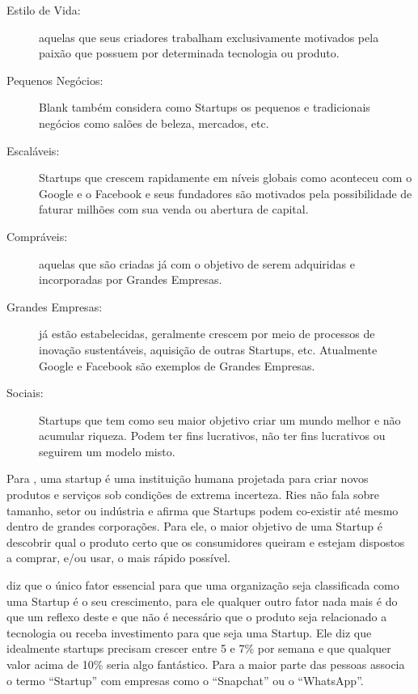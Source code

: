 \begin{description}
	\item [Estilo de Vida:] aquelas que seus criadores trabalham exclusivamente motivados pela paixão que possuem por determinada tecnologia ou produto.

	\item [Pequenos Negócios:] Blank também considera como Startups os pequenos e tradicionais negócios como salões de beleza, mercados, etc.

	\item [Escaláveis:] Startups que crescem rapidamente em níveis globais como aconteceu com o Google e o Facebook e seus fundadores são motivados pela possibilidade de faturar milhões com sua venda ou abertura de capital.

	\item [Compráveis:] aquelas que são criadas já com o objetivo de serem adquiridas e incorporadas por Grandes Empresas.

	\item [Grandes Empresas:] já estão estabelecidas, geralmente crescem por meio de processos de inovação sustentáveis, aquisição de outras Startups, etc. Atualmente Google e Facebook são exemplos de Grandes Empresas.

	\item [Sociais:] Startups que tem como seu maior objetivo criar um mundo melhor e não acumular riqueza. Podem ter fins lucrativos, não ter fins lucrativos ou seguirem um modelo misto.
\end{description}

Para , uma startup é uma instituição humana projetada para criar novos produtos e serviços sob condições de extrema incerteza. Ries não fala sobre tamanho, setor ou indústria e afirma que Startups podem co-existir até mesmo dentro de grandes corporações. Para ele, o maior objetivo de uma Startup é descobrir qual o produto certo que os consumidores queiram e estejam dispostos a comprar, e/ou usar, o mais rápido possível. 

 diz que o único fator essencial para que uma organização seja classificada como uma Startup é o seu crescimento, para ele qualquer outro fator nada mais é do que um reflexo deste e que não é necessário que o produto seja relacionado a tecnologia ou receba investimento para que seja uma Startup. Ele diz que idealmente startups precisam crescer entre 5 e 7\% por semana e que qualquer valor acima de 10\% seria algo fantástico. Para  a maior parte das pessoas associa o termo ``Startup'' com empresas como o ``Snapchat'' ou o ``WhatsApp''.

